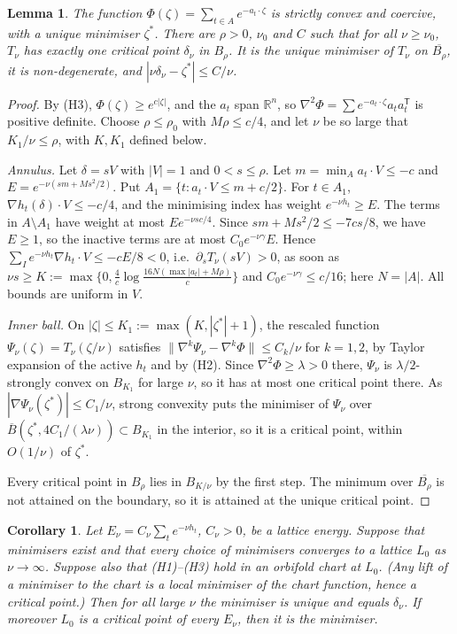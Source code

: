 \documentclass[10pt,twocolumn,a4paper]{article}
\newtheorem{lemma}{Lemma}
\newtheorem{corollary}{Corollary}
\theoremstyle{definition}
\newcommand{\R}{\mathbb{R}}
\begin{document}
\begin{lemma}\label{lem:abstract}
The function $\Phi(\zeta)=\sum_{t\in A}e^{-a_t\cdot\zeta}$ is strictly convex and coercive, with a unique minimiser $\zeta^*$. There are $\rho>0$, $\nu_0$ and $C$ such that for all $\nu\ge\nu_0$, $T_\nu$ has exactly one critical point $\delta_\nu$ in $B_\rho$. It is the unique minimiser of $T_\nu$ on $\overline{B_\rho}$, it is non-degenerate, and $|\nu\delta_\nu-\zeta^*|\le C/\nu$.
\end{lemma}
\begin{proof}
By (H3), $\Phi(\zeta)\ge e^{c|\zeta|}$, and the $a_t$ span $\R^n$, so $\nabla^2\Phi=\sum e^{-a_t\cdot\zeta}a_ta_t^{\mathsf T}$ is positive definite. Choose $\rho\le\rho_0$ with $M\rho\le c/4$, and let $\nu$ be so large that $K_1/\nu\le\rho$, with $K,K_1$ defined below.

\emph{Annulus.} Let $\delta=sV$ with $|V|=1$ and $0<s\le\rho$. Let $m=\min_Aa_t\cdot V\le-c$ and $E=e^{-\nu(sm+Ms^2/2)}$. Put $A_1=\{t:a_t\cdot V\le m+c/2\}$. For $t\in A_1$, $\nabla h_t(\delta)\cdot V\le-c/4$, and the minimising index has weight $e^{-\nu h_t}\ge E$. The terms in $A\setminus A_1$ have weight at most $Ee^{-\nu sc/4}$. Since $sm+Ms^2/2\le-7cs/8$, we have $E\ge1$, so the inactive terms are at most $C_0e^{-\nu\gamma}E$. Hence $\sum_Ie^{-\nu h_t}\nabla h_t\cdot V\le-cE/8<0$, i.e.\ $\partial_sT_\nu(sV)>0$, as soon as $\nu s\ge K:=\max\{0,\frac4c\log\frac{16N(\max|a_t|+M\rho)}c\}$ and $C_0e^{-\nu\gamma}\le c/16$; here $N=|A|$. All bounds are uniform in $V$.

\emph{Inner ball.} On $|\zeta|\le K_1:=\max(K,|\zeta^*|+1)$, the rescaled function $\Psi_\nu(\zeta)=T_\nu(\zeta/\nu)$ satisfies $\|\nabla^k\Psi_\nu-\nabla^k\Phi\|\le C_k/\nu$ for $k=1,2$, by Taylor expansion of the active $h_t$ and by (H2). Since $\nabla^2\Phi\ge\lambda>0$ there, $\Psi_\nu$ is $\lambda/2$-strongly convex on $B_{K_1}$ for large $\nu$, so it has at most one critical point there. As $|\nabla\Psi_\nu(\zeta^*)|\le C_1/\nu$, strong convexity puts the minimiser of $\Psi_\nu$ over $\overline B(\zeta^*,4C_1/(\lambda\nu))\subset B_{K_1}$ in the interior, so it is a critical point, within $O(1/\nu)$ of $\zeta^*$.

Every critical point in $B_\rho$ lies in $B_{K/\nu}$ by the first step. The minimum over $\overline{B_\rho}$ is not attained on the boundary, so it is attained at the unique critical point.
\end{proof}

\begin{corollary}\label{cor:global}
Let $E_\nu=C_\nu\sum_te^{-\nu h_t}$, $C_\nu>0$, be a lattice energy. Suppose that minimisers exist and that every choice of minimisers converges to a lattice $L_0$ as $\nu\to\infty$. Suppose also that (H1)--(H3) hold in an orbifold chart at $L_0$. (Any lift of a minimiser to the chart is a local minimiser of the chart function, hence a critical point.) Then for all large $\nu$ the minimiser is unique and equals $\delta_\nu$. If moreover $L_0$ is a critical point of every $E_\nu$, then it is the minimiser.
\end{corollary}
\end{document}
